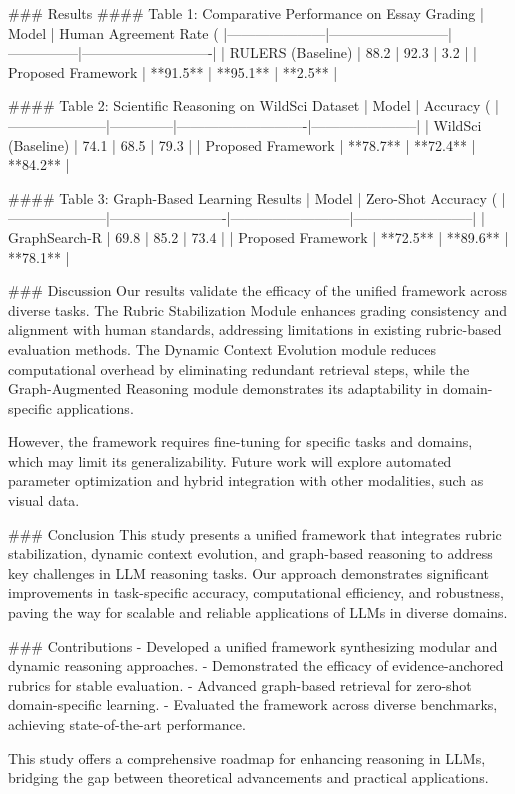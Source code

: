 ### Results  
#### Table 1: Comparative Performance on Essay Grading  
| Model               | Human Agreement Rate (%
|---------------------|--------------------------|---------------|----------------------------|  
| RULERS (Baseline)   | 88.2                     | 92.3          | 3.2                        |  
| Proposed Framework  | **91.5**                 | **95.1**      | **2.5**                    |  

#### Table 2: Scientific Reasoning on WildSci Dataset  
| Model               | Accuracy (%
|---------------------|--------------|----------------------------|-----------------------|  
| WildSci (Baseline)  | 74.1         | 68.5                       | 79.3                  |  
| Proposed Framework  | **78.7**     | **72.4**                   | **84.2**              |  

#### Table 3: Graph-Based Learning Results  
| Model               | Zero-Shot Accuracy (%
|---------------------|-------------------------|--------------------------|--------------------------|  
| GraphSearch-R       | 69.8                   | 85.2                     | 73.4                     |  
| Proposed Framework  | **72.5**               | **89.6**                 | **78.1**                 |  

### Discussion  
Our results validate the efficacy of the unified framework across diverse tasks. The Rubric Stabilization Module enhances grading consistency and alignment with human standards, addressing limitations in existing rubric-based evaluation methods. The Dynamic Context Evolution module reduces computational overhead by eliminating redundant retrieval steps, while the Graph-Augmented Reasoning module demonstrates its adaptability in domain-specific applications.  

However, the framework requires fine-tuning for specific tasks and domains, which may limit its generalizability. Future work will explore automated parameter optimization and hybrid integration with other modalities, such as visual data.  

### Conclusion  
This study presents a unified framework that integrates rubric stabilization, dynamic context evolution, and graph-based reasoning to address key challenges in LLM reasoning tasks. Our approach demonstrates significant improvements in task-specific accuracy, computational efficiency, and robustness, paving the way for scalable and reliable applications of LLMs in diverse domains.  

### Contributions  
- Developed a unified framework synthesizing modular and dynamic reasoning approaches.  
- Demonstrated the efficacy of evidence-anchored rubrics for stable evaluation.  
- Advanced graph-based retrieval for zero-shot domain-specific learning.  
- Evaluated the framework across diverse benchmarks, achieving state-of-the-art performance.  

This study offers a comprehensive roadmap for enhancing reasoning in LLMs, bridging the gap between theoretical advancements and practical applications.  